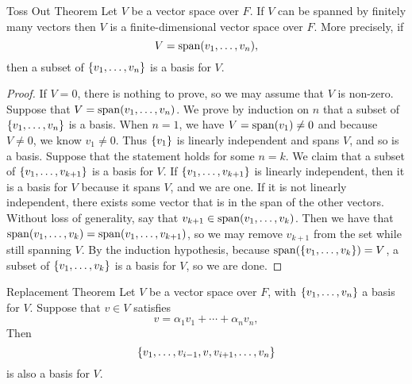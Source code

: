 \documentclass[class=article, crop=false]{standalone}
\begin{document}
  \newpage
  \begin{theorem}{Toss Out Theorem}
    Let $V$ be a vector space over $F$. If $V$ can be spanned by finitely many vectors then $V$ is a finite-dimensional vector space over $F$. More precisely, if 
    \[
      V = \operatorname{span}(v_1,\dotsc,v_n),
    \]
    then a subset of $\left\{v_1,\dotsc,v_n\right\}$ is a basis for $V$.
  \end{theorem}
  \begin{proof}
    If $V = 0$, there is nothing to prove, so we may assume that $V$ is non-zero. Suppose that $V = \operatorname{span}(v_1,\dotsc,v_n)$. We prove by induction on $n$ that a subset of $\left\{v_1,\dotsc,v_n\right\}$ is a basis. When $n = 1$, we have $V = \operatorname{span}(v_1)\neq 0$ and because $V \neq 0$, we know $v_1\neq 0$. Thus $\left\{v_1\right\}$ is linearly independent and spans $V$, and so is a basis. Suppose that the statement holds for some $n = k$. We claim that a subset of $\left\{v_1,\dotsc,v_{k+1}\right\}$ is a basis for $V$. If $\left\{v_1,\dotsc,v_{k+1}\right\}$ is linearly independent, then it is a basis for $V$ because it spans $V$, and we are one. If it is not linearly independent, there exists some vector that is in the span of the other vectors. Without loss of generality, say that $v_{k+1}\in \operatorname{span}(v_1,\dotsc,v_k)$. Then we have that $\operatorname{span}(v_1,\dotsc,v_k) = \operatorname{span}(v_1,\dotsc,v_{k+1})$, so we may remove $v_{k+1}$ from the set while still spanning $V$. By the induction hypothesis, because $\operatorname{span}(\left\{v_1,\dotsc,v_k\right\}) = V$, a subset of $\left\{v_1,\dotsc,v_k\right\}$ is a basis for $V$, so we are done.
  \end{proof}
  \newpage
  \begin{theorem}{Replacement Theorem}
    Let $V$ be a vector space over $F$, with $\left\{v_1,\dotsc,v_n\right\}$ a basis for $V$. Suppose that $v\in V$ satisfies
    \[
      v = \alpha_1v_1 + \dotsb + \alpha_nv_n, \tag{$\alpha_1,\dotsc,\alpha_n\in F, \alpha_i\neq 0$}
    \]
    Then
    \[
      \left\{v_1,\dotsc,v_{i-1},v,v_{i+1},\dotsc,v_n\right\}
    \]
    is also a basis for $V$.
  \end{theorem}
\end{document}
